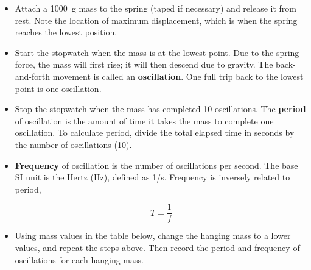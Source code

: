 \documentclass[]{exam}
\begin{document}
\begin{questions}
\begin{parts}
\begin{itemize}[itemsep=0pt,topsep=0pt]
    \item Attach a \SI{1000}{g} mass to the spring (taped if necessary) and release it from rest. Note the location of maximum displacement, which is when the spring reaches the lowest position.
    \item Start the stopwatch when the mass is at the lowest point. Due to the spring force, the mass will first rise; it will then descend due to gravity. The back-and-forth movement is called an \textbf{oscillation}. One full trip back to the lowest point is one oscillation.
    \item Stop the stopwatch when the mass has completed 10 oscillations. The \textbf{period} of oscillation is the amount of time it takes the mass to complete one oscillation. To calculate period, divide the total elapsed time in seconds by the number of oscillations (10). 
    \item \textbf{Frequency} of oscillation is the number of oscillations per second. The base SI unit is the Hertz (Hz), defined as 1/s. Frequency is inversely related to period,

    \begin{equation*}
        T = \frac{1}{f}
    \end{equation*}
    
    \item Using mass values in the table below, change the hanging mass to a lower values, and repeat the steps above. Then record the period and frequency of oscillations for each hanging mass.
\end{itemize}


\end{parts}
\end{questions}
\end{document}
